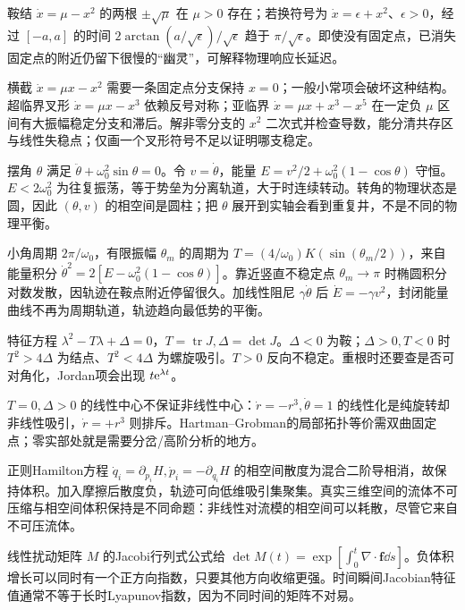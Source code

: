 鞍结 $\dot x=\mu-x^2$ 的两根 $\pm\sqrt\mu$ 在 $\mu>0$ 存在；若换符号为 $\dot x=\epsilon+x^2$、$\epsilon>0$，经过 $[-a,a]$ 的时间 $2\arctan(a/\sqrt\epsilon)/\sqrt\epsilon$ 趋于 $\pi/\sqrt\epsilon$。即使没有固定点，已消失固定点的附近仍留下很慢的“幽灵”，可解释物理响应长延迟。

横截 $\dot x=\mu x-x^2$ 需要一条固定点分支保持 $x=0$；一般小常项会破坏这种结构。超临界叉形 $\dot x=\mu x-x^3$ 依赖反号对称；亚临界 $\dot x=\mu x+x^3-x^5$ 在一定负 $\mu$ 区间有大振幅稳定分支和滞后。解非零分支的 $x^2$ 二次式并检查导数，能分清共存区与线性失稳点；仅画一个叉形符号不足以证明哪支稳定。

摆角 $\theta$ 满足 $\ddot\theta+\omega_0^2\sin\theta=0$。令 $v=\dot\theta$，能量 $E=v^2/2+\omega_0^2(1-\cos\theta)$ 守恒。$E<2\omega_0^2$ 为往复振荡，等于势垒为分离轨道，大于时连续转动。转角的物理状态是圆，因此 $(\theta,v)$ 的相空间是圆柱；把 $\theta$ 展开到实轴会看到重复井，不是不同的物理平衡。

小角周期 $2\pi/\omega_0$，有限振幅 $\theta_m$ 的周期为 $T=(4/\omega_0)K(\sin(\theta_m/2))$，来自能量积分 $\dot\theta^2=2[E-\omega_0^2(1-\cos\theta)]$。靠近竖直不稳定点 $\theta_m\to\pi$ 时椭圆积分对数发散，因轨迹在鞍点附近停留很久。加线性阻尼 $\gamma\dot\theta$ 后 $\dot E=-\gamma v^2$，封闭能量曲线不再为周期轨道，轨迹趋向最低势的平衡。

特征方程 $\lambda^2-T\lambda+\Delta=0$，$T=\operatorname{tr}J,\Delta=\det J$。$\Delta<0$ 为鞍；$\Delta>0,T<0$ 时 $T^2>4\Delta$ 为结点、$T^2<4\Delta$ 为螺旋吸引。$T>0$ 反向不稳定。重根时还要查是否可对角化，Jordan项会出现 $t\mathrm e^{\lambda t}$。

$T=0,\Delta>0$ 的线性中心不保证非线性中心：$\dot r=-r^3,\dot\theta=1$ 的线性化是纯旋转却非线性吸引，$\dot r=+r^3$ 则排斥。Hartman--Grobman的局部拓扑等价需双曲固定点；零实部处就是需要分岔/高阶分析的地方。

正则Hamilton方程 $\dot q_i=\partial_{p_i}H,\dot p_i=-\partial_{q_i}H$ 的相空间散度为混合二阶导相消，故保持体积。加入摩擦后散度负，轨迹可向低维吸引集聚集。真实三维空间的流体不可压缩与相空间体积保持是不同命题：非线性对流模的相空间可以耗散，尽管它来自不可压流体。

线性扰动矩阵 $M$ 的Jacobi行列式公式给 $\det M(t)=\exp[\int_0^t\nabla\cdot\mathbf f\dd s]$。负体积增长可以同时有一个正方向指数，只要其他方向收缩更强。时间瞬间Jacobian特征值通常不等于长时Lyapunov指数，因为不同时间的矩阵不对易。

